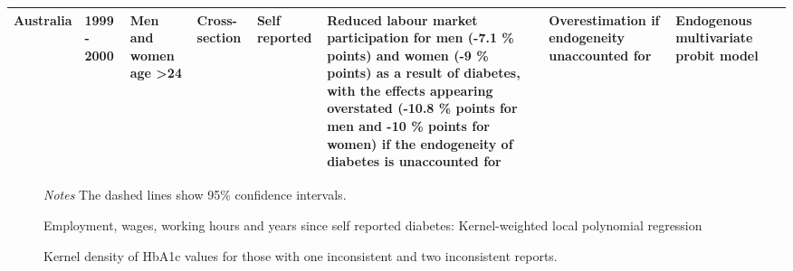 \documentclass[10pt,letterpaper]{article}
\begin{document}
{\begin{landscape}
\begin{tabularx}{\linewidth}{m m m m b b b b m}
			Australia & 1999 - 2000  & Men and women age \textgreater 24                                & Cross-section           & Self reported                                & Reduced labour market participation for men (-7.1 \% points) and women (-9 \% points) as a result of diabetes, with the effects appearing overstated (-10.8 \% points for men and -10 \% points for women) if the endogeneity of diabetes is unaccounted for                                                                                                                                                                                                                                                                                                                                                                                    & Overestimation if endogeneity unaccounted for                                           & Endogenous multivariate probit model                                                                                                                                                                                                                                                                 & \cite{Zhang2009} \\ \bottomrule
		\end{tabularx}
	\end{landscape}
}

\begin{figure}[h!]
	\caption{\label{fig:Kernel-weighted-local-polynomial_comb}Employment, wages, working hours and years since self reported diabetes:  Kernel-weighted local polynomial regression}%
	\begin{center}
		\footnotesize{\textit{Notes} The dashed lines show 95\% confidence intervals.}
	\end{center}
\end{figure}


\begin{figure}[h!]
	\caption{\label{fig:kdens_inconsistency_hba1c}Kernel density of HbA1c values for those with one inconsistent and two inconsistent reports.}%
	\begin{center}
	\end{center}
\end{figure}
\end{document}

